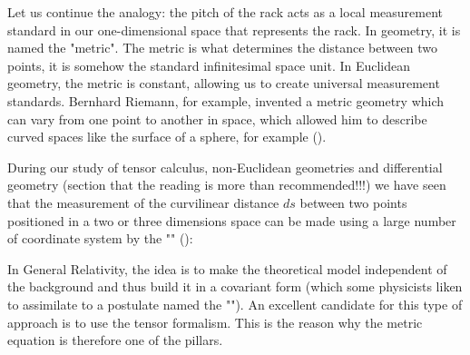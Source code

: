 	Let us continue the analogy: the pitch of the rack acts as a local measurement standard in our one-dimensional space that represents the rack. In geometry, it is named the "metric". The metric is what determines the distance between two points, it is somehow the standard infinitesimal space unit. In Euclidean geometry, the metric is constant, allowing us to create universal measurement standards. Bernhard Riemann, for example, invented a metric geometry which can vary from one point to another in space, which allowed him to describe curved spaces like the surface of a sphere, for example ().
	
	During our study of tensor calculus, non-Euclidean geometries and differential geometry (section that the reading is more than recommended!!!) we have seen that the measurement of the curvilinear distance $ds$ between two points positioned in a two or three dimensions space can be made using a large number of coordinate system by the "" ():
	
	In General Relativity, the idea is to make the theoretical model independent of the background and thus build it in a covariant form (which some physicists liken to assimilate to a postulate named the ""). An excellent candidate for this type of approach is to use the tensor formalism. This is the reason why the metric equation is therefore one of the pillars.
	
